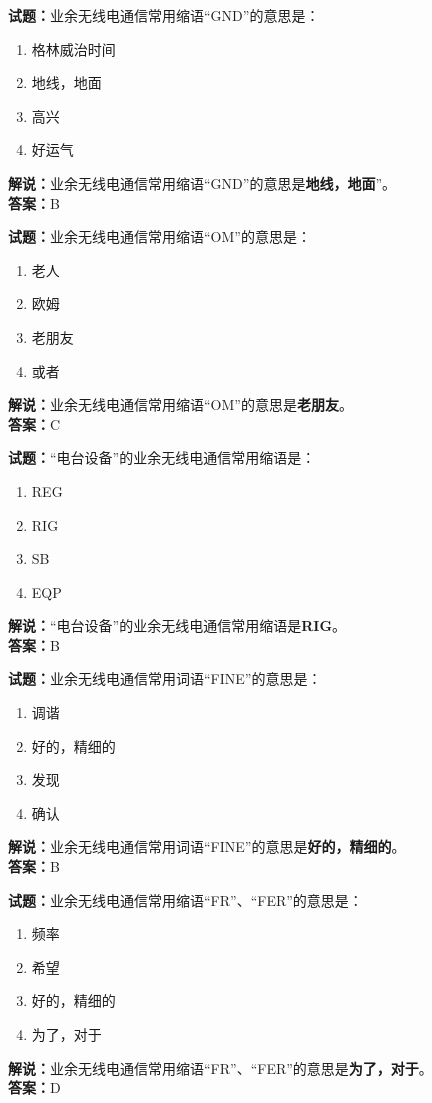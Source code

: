 \documentclass{ctexbook}
\begin{document}
\noindent\textbf{试题：}业余无线电通信常用缩语“GND”的意思是：
\begin{enumerate}[leftmargin=3em]
\item 格林威治时间
\item 地线，地面
\item 高兴
\item 好运气
\end{enumerate}
\noindent\textbf{解说：}业余无线电通信常用缩语“GND”的意思是\textbf{地线，地面}”。\\\noindent\textbf{答案：}B

\bigskip


\noindent\textbf{试题：}业余无线电通信常用缩语“OM”的意思是：
\begin{enumerate}[leftmargin=3em]
\item 老人
\item 欧姆
\item 老朋友
\item 或者
\end{enumerate}
\noindent\textbf{解说：}业余无线电通信常用缩语“OM”的意思是\textbf{老朋友}。\\\noindent\textbf{答案：}C

\bigskip


\noindent\textbf{试题：}“电台设备”的业余无线电通信常用缩语是：
\begin{enumerate}[leftmargin=3em]
\item REG
\item RIG
\item SB
\item EQP
\end{enumerate}
\noindent\textbf{解说：}“电台设备”的业余无线电通信常用缩语是\textbf{RIG}。\\\noindent\textbf{答案：}B

\bigskip


\noindent\textbf{试题：}业余无线电通信常用词语“FINE”的意思是：
\begin{enumerate}[leftmargin=3em]
\item 调谐
\item 好的，精细的
\item 发现
\item 确认
\end{enumerate}
\noindent\textbf{解说：}业余无线电通信常用词语“FINE”的意思是\textbf{好的，精细的}。\\\noindent\textbf{答案：}B
\bigskip


\noindent\textbf{试题：}业余无线电通信常用缩语“FR”、“FER”的意思是：
\begin{enumerate}[leftmargin=3em]
\item 频率
\item 希望
\item 好的，精细的
\item 为了，对于
\end{enumerate}
\noindent\textbf{解说：}业余无线电通信常用缩语“FR”、“FER”的意思是\textbf{为了，对于}。\\\noindent\textbf{答案：}D
\end{document}

